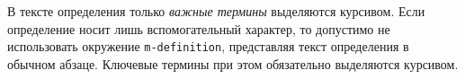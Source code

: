\begin{m-definition}[термин] %
	\label{def:ex}
	В тексте определения только {\itshape важные термины} выделяются курсивом. Если определение носит лишь вспомогательный характер, то допустимо не использовать окружение \texttt{m-definition}, представляя текст определения в обычном абзаце. Ключевые термины при этом обязательно выделяются курсивом.
\end{m-definition}
